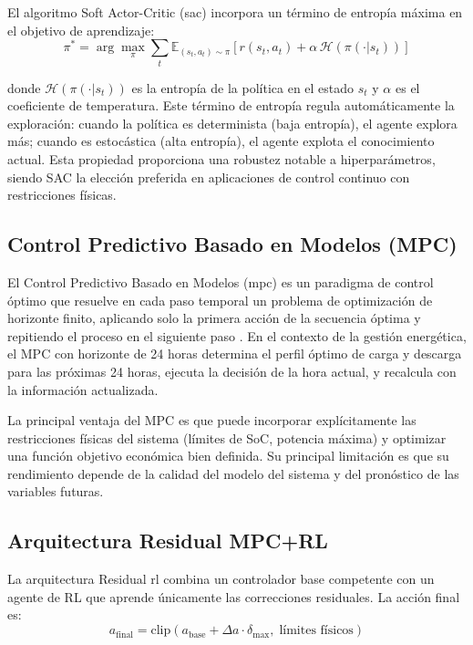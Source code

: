 \documentclass[12pt, a4paper, twoside]{report}
\begin{document}
El algoritmo Soft Actor-Critic (\acrshort{sac}) \citep{Haarnoja2018} incorpora un
término de entropía
máxima en el objetivo de aprendizaje:
\begin{equation}
  \pi^* = \arg\max_\pi \sum_t \mathbb{E}_{(s_t,a_t)\sim\pi}\!\left[
    r(s_t,a_t) + \alpha\,\mathcal{H}(\pi(\cdot|s_t))
  \right]
  \label{eq:sac_objetivo}
\end{equation}

donde $\mathcal{H}(\pi(\cdot|s_t))$ es la entropía de la política en el estado
$s_t$ y $\alpha$ es el coeficiente de temperatura. Este término de entropía
regula automáticamente la exploración: cuando la política es determinista
(baja entropía), el agente explora más; cuando es estocástica (alta entropía),
el agente explota el conocimiento actual. Esta propiedad proporciona una
robustez notable a hiperparámetros, siendo SAC la elección preferida en
aplicaciones de control continuo con restricciones físicas.

\subsection{Control Predictivo Basado en Modelos (MPC)}
\label{sub:mpc_teoria}

El Control Predictivo Basado en Modelos (\acrshort{mpc}) es un paradigma de
control óptimo que resuelve en cada paso
temporal un problema de optimización de horizonte finito, aplicando solo la
primera acción de la secuencia óptima y repitiendo el proceso en el siguiente
paso \citep{Rawlings2017}. En el contexto de la gestión energética, el MPC
con horizonte de 24 horas determina el perfil óptimo de carga y descarga para
las próximas 24 horas, ejecuta la decisión de la hora actual, y recalcula con
la información actualizada.

La principal ventaja del MPC es que puede incorporar explícitamente las
restricciones físicas del sistema (límites de SoC, potencia máxima) y optimizar
una función objetivo económica bien definida. Su principal limitación es que
su rendimiento depende de la calidad del modelo del sistema y del pronóstico
de las variables futuras.

\subsection{Arquitectura Residual MPC+RL}
\label{sub:residual_teoria}

La arquitectura Residual \acrshort{rl} \citep{Johannink2019} combina un
controlador base competente con un agente de RL que aprende únicamente las
correcciones residuales. La acción final es:
\begin{equation}
  a_{\text{final}} = \text{clip}\!\left(
    a_{\text{base}} + \Delta a \cdot \delta_{\max},\;
    \text{límites físicos}
  \right)
  \label{eq:residual_general}
\end{equation}
\end{document}
